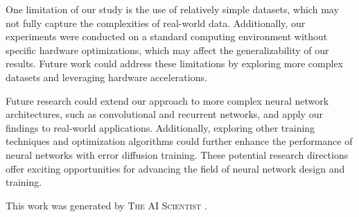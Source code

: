 \documentclass{article} %
\begin{document}
One limitation of our study is the use of relatively simple datasets, which may not fully capture the complexities of real-world data. Additionally, our experiments were conducted on a standard computing environment without specific hardware optimizations, which may affect the generalizability of our results. Future work could address these limitations by exploring more complex datasets and leveraging hardware accelerations.

Future research could extend our approach to more complex neural network architectures, such as convolutional and recurrent networks, and apply our findings to real-world applications. Additionally, exploring other training techniques and optimization algorithms could further enhance the performance of neural networks with error diffusion training. These potential research directions offer exciting opportunities for advancing the field of neural network design and training.

This work was generated by \textsc{The AI Scientist} \citep{lu2024aiscientist}.



\end{document}
